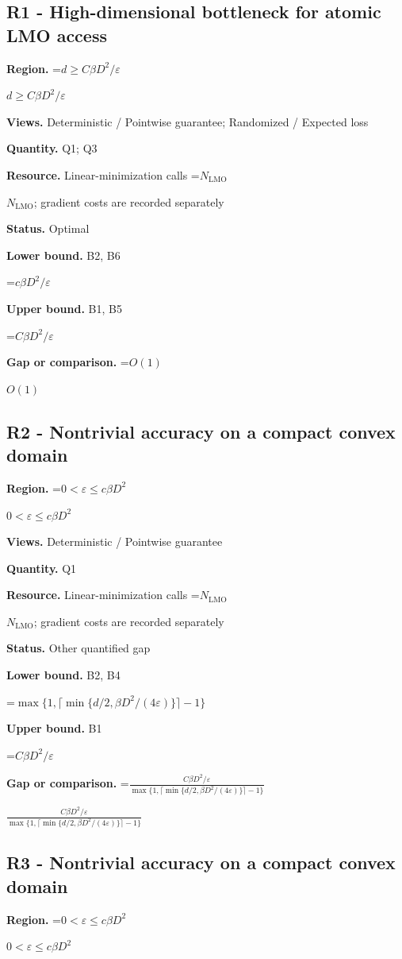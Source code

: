 \documentclass[10pt,a4paper]{article}
\newcommand{\AtlasMath}[1]{\par\begingroup\centering\setbox0=\hbox{$\displaystyle #1$}\ifdim\wd0>1.4\linewidth\typeout{ATLAS WIDE FORMULA: \the\wd0}\fi\ifdim\wd0>\linewidth\resizebox{\linewidth}{!}{\box0}\else\box0\fi\par\endgroup}
\newcommand{\AtlasInlineMath}[1]{\begingroup\setbox0=\hbox{$#1$}\ifdim\wd0>.4\linewidth\endgroup\AtlasMath{#1}\else\endgroup$#1$\fi}
\begin{document}
\subsection{R1 - High-dimensional bottleneck for atomic LMO access}
\textbf{Region.} \AtlasInlineMath{d\ge C\beta D^2/\varepsilon}

\textbf{Views.} Deterministic / Pointwise guarantee; Randomized / Expected loss

\textbf{Quantity.} Q1; Q3

\textbf{Resource.} Linear-minimization calls \AtlasInlineMath{N_{\mathrm{LMO}}}; gradient costs are recorded separately

\textbf{Status.} Optimal

\textbf{Lower bound.} B2, B6

\AtlasMath{c\beta D^2/\varepsilon}
\textbf{Upper bound.} B1, B5

\AtlasMath{C\beta D^2/\varepsilon}
\textbf{Gap or comparison.} \AtlasInlineMath{O(1)}

\subsection{R2 - Nontrivial accuracy on a compact convex domain}
\textbf{Region.} \AtlasInlineMath{0<\varepsilon\le c\beta D^2}

\textbf{Views.} Deterministic / Pointwise guarantee

\textbf{Quantity.} Q1

\textbf{Resource.} Linear-minimization calls \AtlasInlineMath{N_{\mathrm{LMO}}}; gradient costs are recorded separately

\textbf{Status.} Other quantified gap

\textbf{Lower bound.} B2, B4

\AtlasMath{\max\{1,\lceil\min\{d/2,\beta D^2/(4\varepsilon)\}\rceil-1\}}
\textbf{Upper bound.} B1

\AtlasMath{C\beta D^2/\varepsilon}
\textbf{Gap or comparison.} \AtlasInlineMath{\frac{C\beta D^2/\varepsilon}{\max\{1,\lceil\min\{d/2,\beta D^2/(4\varepsilon)\}\rceil-1\}}}

\subsection{R3 - Nontrivial accuracy on a compact convex domain}
\textbf{Region.} \AtlasInlineMath{0<\varepsilon\le c\beta D^2}
\end{document}
